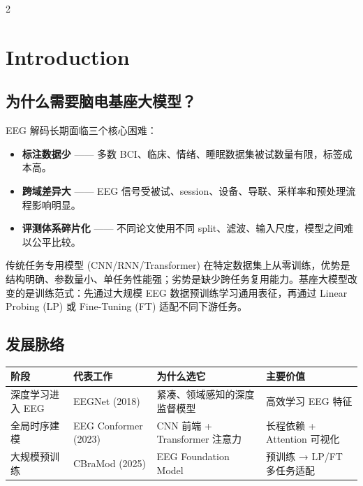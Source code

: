\documentclass[12pt, a0paper]{article}
\renewcommand{\small}{\fontsize{18}{24}\selectfont}
\begin{document}
\begin{multicols}{2}

\section{Introduction}

\subsection{为什么需要脑电基座大模型？}

EEG 解码长期面临三个核心困难：

\begin{itemize}
    \item \textbf{标注数据少} —— 多数 BCI、临床、情绪、睡眠数据集被试数量有限，标签成本高。
    \item \textbf{跨域差异大} —— EEG 信号受被试、session、设备、导联、采样率和预处理流程影响明显。
    \item \textbf{评测体系碎片化} —— 不同论文使用不同 split、滤波、输入尺度，模型之间难以公平比较。
\end{itemize}

传统任务专用模型 (CNN/RNN/Transformer) 在特定数据集上从零训练，优势是结构明确、参数量小、单任务性能强；劣势是缺少跨任务复用能力。基座大模型改变的是训练范式：先通过大规模 EEG 数据预训练学习通用表征，再通过 Linear Probing (LP) 或 Fine-Tuning (FT) 适配不同下游任务。

\subsection{发展脉络}

\begin{center}
{\small
{}
\begin{tabular}{llll}
\toprule
\textbf{阶段} & \textbf{代表工作} & \textbf{为什么选它} & \textbf{主要价值} \\
\midrule
深度学习进入 EEG & EEGNet (2018) & 紧凑、领域感知的深度监督模型 & 高效学习 EEG 特征 \\
全局时序建模 & EEG Conformer (2023) & CNN 前端 + Transformer 注意力 & 长程依赖 + Attention 可视化 \\
大规模预训练 & CBraMod (2025) & EEG Foundation Model & 预训练 → LP/FT 多任务适配 \\
\bottomrule
\end{tabular}
}
\end{center}


\end{multicols}
\end{document}
